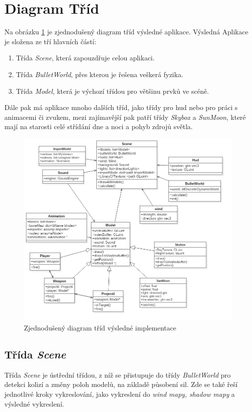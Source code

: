 \section{Diagram Tříd}
Na obrázku \ref{ClassDia} je zjednodušený diagram tříd výsledné aplikace. Výsledná Aplikace je složena ze tří hlavních částí:
\begin{enumerate}
	\item Třída \emph{Scene}, která zapouzdřuje celou aplikaci.
	\item Třída \emph{BulletWorld}, přes kterou je řešena veškerá fyzika.
	\item Třída \emph{Model}, která je výchozí třídou pro většinu prvků ve scéně.
\end{enumerate} 
Dále pak má aplikace  mnoho dalších tříd, jako třídy pro hud nebo pro práci s animacemi či zvukem, mezi zajímavější pak patří třídy \emph{Skybox} a \emph{SunMoon}, které mají na starosti celé střídání dne a noci a pohyb zdrojů světla. 
\begin{figure}
	\begin{center}
		\includegraphics[scale=0.5]{obrazky-figures/ClassDia}
		\caption{Zjednodušený diagram tříd výsledné implementace}\label{ClassDia}
\end{center}\end{figure}


\subsection{Třída \emph{Scene}}
Třída \emph{Scene} je ústřední třídou, z níž se přistupuje do třídy \emph{BulletWorld} pro detekci kolizí a změny poloh modelů, na základě působení sil. Zde se také řeší jednotlivé kroky vykreslování, jako vykreslení do \emph{wind mapy, shadow mapy} a výsledné vykreslení.

